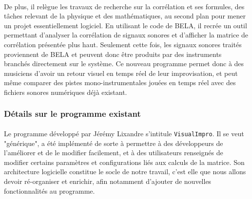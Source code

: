 \paragraph{}
De plus, il relègue les travaux de recherche sur la corrélation et ses
formules, des tâches relevant de la physique et des mathématiques, au
second plan pour mener un projet essentiellement logiciel. En
utilisant le code de BELA, il recrée un outil permettant d'analyser la
corrélation de signaux sonores et d'afficher la matrice de corrélation
présentée plus haut. Seulement cette fois, les signaux sonores traités
proviennent de BELA et peuvent donc être produits par des instruments
branchés directement sur le système. Ce nouveau programme permet donc
à des musiciens d'avoir un retour visuel en temps réel de leur
improvisation, et peut même comparer des pistes mono-instrumentales
jouées en temps réel avec des fichiers sonores numériques déjà
existant.

\subsubsection{Détails sur le programme existant}
\paragraph{}
Le programme développé par Jérémy Lixandre s'intitule
\verb!VisualImpro!. Il se veut "générique", a été implémenté de sorte
à permettre à des développeurs de l'améliorer et de le modifier
facilement, et à des utilisateurs renseignés de modifier certains
paramètres et configurations liés aux calculs de la matrice. Son
architecture logicielle constitue le socle de notre travail, c'est
elle que nous allons devoir ré-organiser et enrichir, afin notamment
d'ajouter de nouvelles fonctionnalités au programme.
